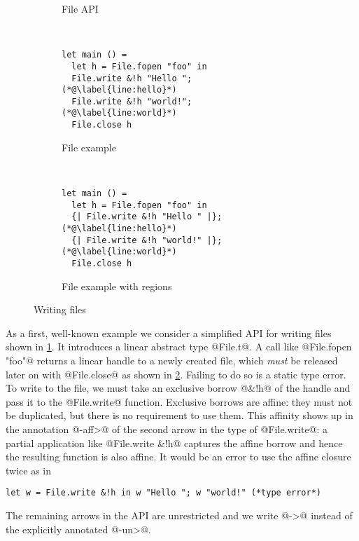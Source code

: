 \begin{figure}[tp]
  \begin{subfigure}[t]{0.35\linewidth}
    
    \vspace{-15pt}
    \caption{File API}
    \label{fig:writing-files-api}
  \end{subfigure}~
  \begin{subfigure}[t]{0.3\linewidth}
\begin{lstlisting}
let main () =
  let h = File.fopen "foo" in
  File.write &!h "Hello ";(*@\label{line:hello}*)
  File.write &!h "world!";(*@\label{line:world}*)
  File.close h
\end{lstlisting}
    \vspace{-10pt}
    \caption{File example}
    \label{fig:writing-files-example}
  \end{subfigure}~
  \begin{subfigure}[t]{0.3\linewidth}
\begin{lstlisting}
let main () =
  let h = File.fopen "foo" in
  {| File.write &!h "Hello " |};(*@\label{line:hello}*)
  {| File.write &!h "world!" |};(*@\label{line:world}*)
  File.close h
\end{lstlisting}
    \vspace{-10pt}
    \caption{File example with regions}
    \label{fig:writing-files-example-region}
  \end{subfigure}
  \vspace{-10pt}
  \caption{Writing files}
  \label{fig:writing-files}
\end{figure}



As a first, well-known example we consider a simplified API for
writing files shown in \cref{fig:writing-files-api}.  It introduces a
linear abstract type @File.t@. A call like
@File.fopen "foo"@ returns a linear handle to a newly created
file, which \emph{must} be released later on with @File.close@
as shown in \cref{fig:writing-files-example}. Failing to do so is a
static type error.  To write to the file, we must take an exclusive
borrow @&!h@ of the handle and pass it to the
@File.write@ function. Exclusive borrows are affine:
they must not be duplicated, but there is no requirement to use
them. This affinity shows up in the annotation @-{aff}>@ of the second arrow in
the type of @File.write@: a partial application like
@File.write &!h@ captures the affine borrow and hence the
resulting function is also affine. It
would be an error to use the affine closure twice as in
\begin{lstlisting}
let w = File.write &!h in w "Hello "; w "world!" (*type error*)
\end{lstlisting}
The remaining arrows in
the API are unrestricted and we write @->@ instead of the
explicitly annotated @-{un}>@.

